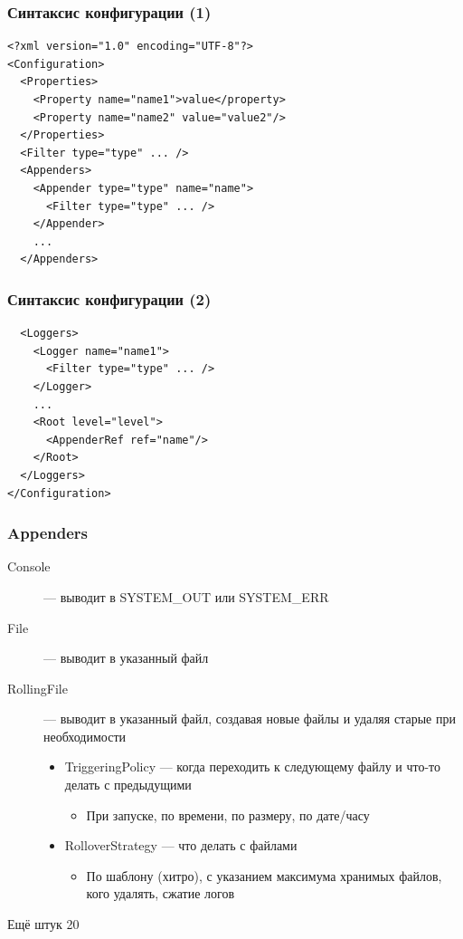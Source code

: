 \documentclass[xetex,mathserif,serif]{beamer}
\begin{document}
	\begin{frame}[fragile]
		\frametitle{Синтаксис конфигурации (1)}
		\begin{verbatim}
<?xml version="1.0" encoding="UTF-8"?>
<Configuration>
  <Properties>
    <Property name="name1">value</property>
    <Property name="name2" value="value2"/>
  </Properties>
  <Filter type="type" ... />
  <Appenders>
    <Appender type="type" name="name">
      <Filter type="type" ... />
    </Appender>
    ...
  </Appenders>
		\end{verbatim}
\end{frame}

	\begin{frame}[fragile]
		\frametitle{Синтаксис конфигурации (2)}
		\begin{verbatim}
  <Loggers>
    <Logger name="name1">
      <Filter type="type" ... />
    </Logger>
    ...
    <Root level="level">
      <AppenderRef ref="name"/>
    </Root>
  </Loggers>
</Configuration>
		\end{verbatim}
\end{frame}

	\begin{frame}
		\frametitle{Appenders}
		\begin{description}
			\item [Console] --- выводит в SYSTEM\_OUT или SYSTEM\_ERR
			\item [File] --- выводит в указанный файл
			\item [RollingFile] --- выводит в указанный файл, создавая новые файлы и удаляя старые при необходимости
			\begin{itemize}
				\item TriggeringPolicy --- когда переходить к следующему файлу и что-то делать с предыдущими
				\begin{itemize}
					\item При запуске, по времени, по размеру, по дате/часу
				\end{itemize}
				\item RolloverStrategy --- что делать с файлами
				\begin{itemize}
					\item По шаблону (хитро), с указанием максимума хранимых файлов, кого удалять, сжатие логов
				\end{itemize}
			\end{itemize}
			\item [Ещё штук 20]
		\end{description}
	\end{frame}
\end{document}
